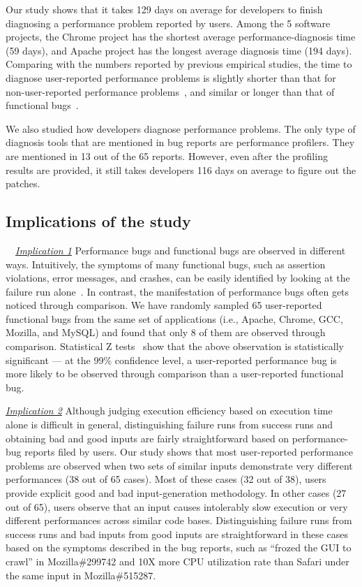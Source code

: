 Our study shows that it takes 129 days on average for developers to finish
diagnosing a performance problem reported by users.
Among the 5 software projects, the Chrome project has the shortest average
performance-diagnosis time (59 days), and Apache project has the longest
average diagnosis time (194 days).
Comparing with the numbers reported by previous empirical studies,
the time to diagnose user-reported performance problems is slightly shorter
than that for non-user-reported performance problems~\citep{PerfBug},
and similar or longer than that of 
functional bugs~\citep{characteristics.asplos08,PerfBug}. 

We also studied how developers diagnose performance problems.
The only type of diagnosis tools that are mentioned in bug reports are
performance profilers. They are mentioned in 13 out of the 65 reports.
However, even after the profiling results are provided, it still takes
developers 116 days on average to figure out the patches.


\subsection{Implications of the study}
\label{sec:study_imp}

\ \ \underline{\textit{Implication 1}}
Performance bugs and functional bugs are observed in different ways.
Intuitively, the symptoms of many functional bugs, such as assertion violations,
error messages, and crashes, can be easily identified by looking
at the failure run alone~\citep{LiASID06}.
In contrast, the manifestation
of performance bugs often gets noticed through comparison.
We have randomly sampled 65 user-reported functional bugs from the same set
of applications (i.e., Apache, Chrome, GCC, Mozilla, and MySQL) and found that
only 8 of them are observed through comparison.
Statistical Z tests~\citep{ztest} show that the above observation is 
statistically
significant --- at the 99\% confidence level, 
a user-reported performance bug is more likely to be observed through 
comparison than a user-reported functional bug.

\underline{\textit{Implication 2}}
Although judging execution efficiency based on execution time alone 
is difficult in
general, distinguishing failure runs from success runs and obtaining bad and good
inputs are fairly straightforward based on performance-bug reports filed by 
users.
Our study shows that most user-reported performance problems are observed when 
two sets of similar inputs demonstrate very different performances (38 out of 
65 cases). 
Most of these cases (32 out of 38), users provide explicit good and bad 
input-generation methodology. 
In other cases (27 out of 65),
users observe that an input causes intolerably slow execution or very different
performances across similar code bases. Distinguishing
failure runs from success runs and bad inputs from good inputs are 
straightforward in these cases based on the symptoms described
in the bug reports, such as ``frozed the GUI to
crawl'' in Mozilla\#299742 and 10X more CPU utilization rate than Safari 
under the same input in Mozilla\#515287. 

